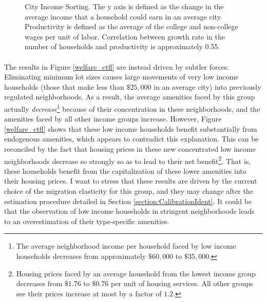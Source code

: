 \documentclass[]{article}
\begin{document}
\begin{figure}[htbp]
\centering
		
		\caption{City Income Sorting. The y axis is defined as the change in the average income that a household could earn in an average city. Productivity is defined as the average of the college and non-college wages per unit of labor. Correlation between growth rate in the number of households and productivity is approximately 0.55.}\label{city_inc_sorting}

\end{figure}

\paragraph*{}
The results in Figure \ref{welfare_ctfl} are instead driven by subtler forces. Eliminating minimum lot sizes causes large movements of very low income households (those that make less than $\$25,000$ in an average city) into previously regulated neighborhoods. As a result, the average amenities faced by this group actually \textit{decrease}\footnote{The average neighborhood income per household faced by low income households decreases from approximately $\$60,000$ to $\$35,000$.} because of their concentration in these neighborhoods, and the amenities faced by all other income groups increase. However, Figure \ref{welfare_ctfl} shows that these low income households benefit substantially from endogenous amenities, which appears to contradict this explanation. This can be reconciled by the fact that housing prices in these new concentrated low income neighborhoods decrease so strongly so as to lead to their net benefit\footnote{Housing prices faced by an average household from the lowest income group decreases from $\$1.76$ to $\$0.76$ per unit of housing services. All other groups see their prices increase at most by a factor of $1.2$.}. That is, these households benefit from the capitalization of these lower amenities into their housing prices. I want to stress that these results are driven by the current choice of the migration elasticity for this group, and they may change after the estimation procedure detailed in Section \ref{section:CalibrationIdent}. It could be that the observation of low income households in stringent neighborhoods leads to an overestimation of their type-specific amenities.
\end{document}
